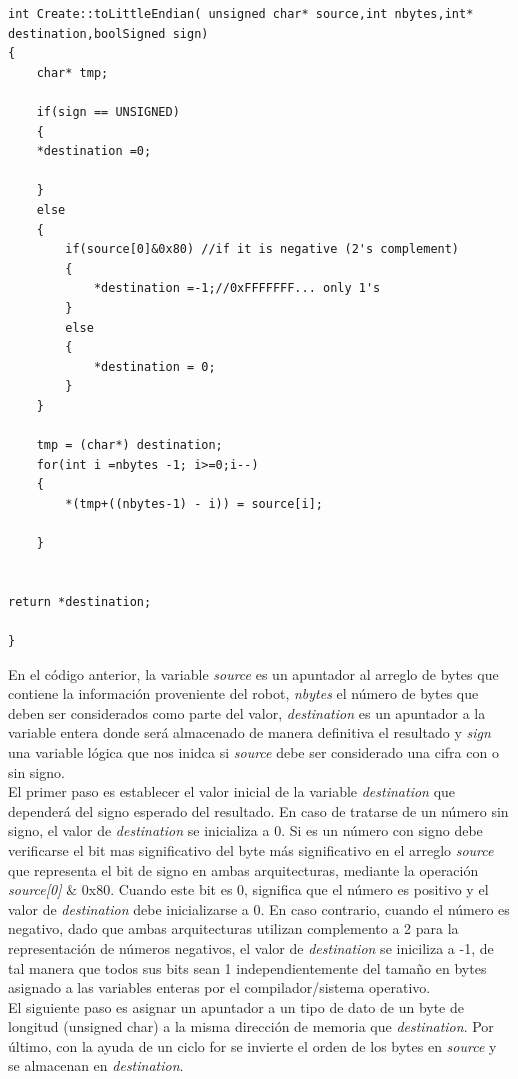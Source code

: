 \documentclass[letterpaper,openright,12pt]{book}
\begin{document}
\begin{lstlisting}
int Create::toLittleEndian( unsigned char* source,int nbytes,int* destination,boolSigned sign)
{
	char* tmp;	

	if(sign == UNSIGNED)
	{
	*destination =0;
	
	}
	else
	{
		if(source[0]&0x80) //if it is negative (2's complement)
		{
			*destination =-1;//0xFFFFFFF... only 1's
		}
		else
		{
			*destination = 0;
		}
	}
	
	tmp = (char*) destination;
	for(int i =nbytes -1; i>=0;i--)
	{
		*(tmp+((nbytes-1) - i)) = source[i];
		
	}	


return *destination;

}
\end{lstlisting}
En el código anterior, la variable \emph{source} es un apuntador al arreglo de bytes que contiene la información proveniente del robot, \emph{nbytes} el número de bytes que deben ser considerados como parte del valor, \emph{destination} es un apuntador a la variable entera donde será almacenado de manera definitiva el resultado y \emph{sign} una variable lógica que nos inidca si \emph{source} debe ser considerado una cifra con o sin signo.\\
El primer paso es establecer el valor inicial de la variable \emph{destination} que dependerá del signo esperado del resultado. En caso de tratarse de un número sin signo, el valor de \emph{destination} se inicializa a 0. Si es un número con signo debe verificarse el bit mas significativo del byte más significativo en el arreglo \emph{source} que representa el bit de signo en ambas arquitecturas, mediante la operación \emph{source[0]} $\&$ 0x80. Cuando este bit es 0, significa que el número es positivo y el valor de \emph{destination} debe inicializarse a 0. En caso contrario, cuando el número es negativo, dado que ambas arquitecturas utilizan complemento a 2 para la representación de números negativos, el valor de \emph{destination} se iniciliza a -1, de tal manera que todos sus bits sean 1 independientemente del tamaño en bytes asignado a las variables enteras por el compilador/sistema operativo.\\
El siguiente paso es asignar un apuntador a un tipo de dato de un byte de longitud (unsigned char) a la misma dirección de memoria que \emph{destination}. Por último, con la ayuda de un ciclo for se invierte el orden de los bytes en \emph{source} y se almacenan en \emph{destination}.\\
\end{document}
